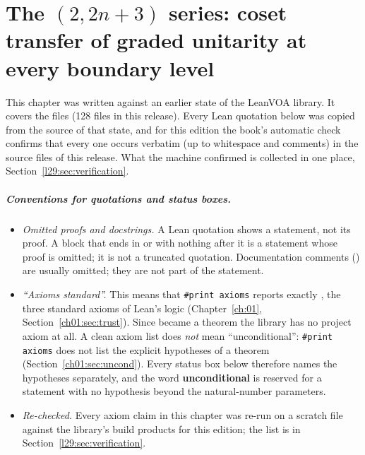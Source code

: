 \chapter[The (2,2n+3) series: coset transfer at every boundary level]{The \texorpdfstring{$(2,2n+3)$}{(2,2n+3)} series: coset transfer of graded unitarity at every boundary level}\label{ch:L29}
\begingroup\setlength{\emergencystretch}{3em}\sloppy

\providecommand{\ltwentyninesl}{\mathfrak{sl}_2}
\providecommand{\ltwentyninegr}{\operatorname{gr}}
\providecommand{\ltwentyninevac}{|0\rangle}
\providecommand{\ltwentynineGU}{\mathrm{GU}}
\providecommand{\ltwentynineJ}{J_\infty}
\providecommand{\ltwentynineinv}{\mathcal I}
\providecommand{\ltwentyninegc}{g}
\providecommand{\ltwentynineRn}{R_n}
\providecommand{\ltwentynineS}{S_{n,r}}
\providecommand{\ltwentynineR}{\mathbb{R}}
\providecommand{\ltwentynineln}[1]{\nolinkurl{#1}}

This chapter was written against an earlier state of the LeanVOA library. It covers the files
 (128 files in this release). Every Lean quotation below was copied from the source of
that state, and for this edition the book's automatic check confirms that every one occurs verbatim (up to whitespace and
comments) in the source files of this release. What the machine confirmed is collected in one place,
Section~\ref{l29:sec:verification}.

\paragraph{Conventions for quotations and status boxes.}
\begin{itemize}
\item \emph{Omitted proofs and docstrings.} A Lean quotation shows a statement, not its proof. A block that ends in
  \lean{:=} or  with nothing after it is a statement whose proof is omitted; it is not a truncated
  quotation. Documentation comments () are usually omitted; they are not part of the statement.
\item \emph{``Axioms standard''.} This means that \texttt{\#print axioms} reports exactly
  , the three standard axioms of Lean's logic (Chapter~\ref{ch:01},
  Section~\ref{ch01:sec:trust}). Since  became a theorem the library has no project
  axiom at all. A clean axiom list does \emph{not} mean ``unconditional'': \texttt{\#print axioms} does not list the
  explicit hypotheses of a theorem (Section~\ref{ch01:sec:uncond}). Every status box below therefore names the
  hypotheses separately, and the word \textbf{unconditional} is reserved for a statement with no hypothesis beyond the
  natural-number parameters.
\item \emph{Re-checked.} Every axiom claim in this chapter was re-run on a scratch file against the library's build
  products for this edition; the list is in Section~\ref{l29:sec:verification}.
\end{itemize}

